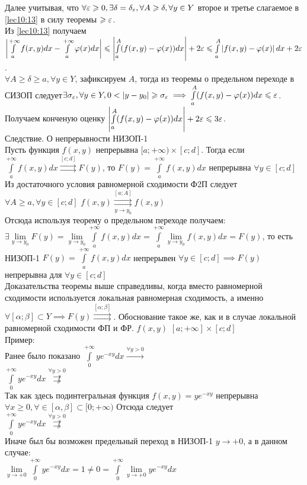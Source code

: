 \documentclass[a4paper,12pt,openany]{report}
\begin{document}
Далее учитывая, что $\forall \varepsilon \geqslant 0, \exists \delta = \delta_\varepsilon, \forall 
A \geqslant \delta, \forall y \in Y  $ второе и третье слагаемое в \eqref{lec10:13}
в силу теоремы $ \geqslant \varepsilon$.
\\
Из \eqref{lec10:13} получаем $ \left| \int\limits_{a}^{+\infty}f(x,y)dx - 
\int\limits_{a}^{+\infty}\varphi(x)dx\right| \leqslant \left| 
\int\limits_{a}^{A}(f(x,y) - \varphi(x))dx \right| + 2\varepsilon \leqslant 
\int\limits_{a}^{A}\left| f(x,y) - \varphi(x)\right|dx + 2\varepsilon  $.
\\
$ \forall A \ge \delta \ge a, \forall y \in Y$, зафиксируем $A$, тогда из 
теоремы о предельном переходе в СИЗОП следует$ \exists \sigma_\varepsilon, \forall y 
\in Y, 0 < \left|y - y_0 \right| \geqslant \sigma_\varepsilon \implies 
\int\limits_{a}^{A}(f(x,y) - \varphi(x))dx \leqslant \varepsilon   $.
\\
Получаем конченую оценку $\left| \int\limits_{a}^{A}(f(x,y) - \varphi(x))dx 
\right| + 2\varepsilon \leqslant 3\varepsilon$.
\\
Следствие. О непрерывности НИЗОП-1
\\
Пусть функция $f(x,y)$ непрерывна $[a;+\infty) \times [ c; d]$. Тогда если 
$\int\limits_a^{+\infty}f(x,y)dx \overset{[c;d]}\rightrightarrows F(y)$, то
$ F(y) = \int\limits_a^{+\infty}f(x,y)dx$ непрерывна $\forall y \in [c;d]$
Из достаточного условия равномерной сходимости Ф2П следует $\forall A \ge a, 
\forall y \in [c;d] $ $f(x,y) \overset{[a;A]}{\underset{y \to 
y_0}{\rightrightarrows}} f(x,y) $
\\
Отсюда используя теорему о предельном переходе получаем:$\exists \underset{y 
\to y_0}{\lim} F(y) = \underset{y \to y_0}\lim \int\limits_a^{+\infty}f(x,y)dx 
= \int\limits_a^{+\infty}\underset{y \to y_0}\lim f(x,y)dx = F(y) $, то есть 
НИЗОП-1 $F(y) = \int\limits_a^{+\infty}f(x,y)dx $ непрерывен $ \forall y \in 
[c;d] \implies F(y) $непрерывна для $ \forall y \in [c;d]$
\\
Доказательства теоремы выше справедливы, когда вместо равномерной сходимости 
используется локальная равномерная сходимость, а именно$\forall [\alpha;\beta] 
\subset Y \implies F(y) \overset{[\alpha;\beta]}{\rightrightarrows}$. 
Обоснование такое же, как и в случае локальной равномерной сходимости ФП и ФР.
$f(x,y)$ $[a;+\infty]\times[c;d]$
\\
Пример:
\\
Ранее было показано
$\int\limits_0^{+\infty}ye^{-xy}dx \xrightarrow{\forall y > 0}$
\\
$\int\limits_0^{+\infty}ye^{-xy}dx \overset{\forall y > 
0}{\not\rightrightarrows}$
\\
Так как здесь подинтегральная функция $f(x,y) = ye^{-xy}$ непрерывна $\forall 
x \ge 0, \forall \in [\alpha,\beta] \subset [0;+\infty)$ 
Отсюда следует
\\
$\int\limits_0^{+\infty}ye^{-xy}dx \overset{\forall y > 
0}{\not\rightrightarrows}$
\\
Иначе был бы возможен предельный переход в НИЗОП-1 $y \to +0 $, а в данном 
случае:
\\
$\underset{y \to +0}\lim\int\limits_0^{+\infty}ye^{-xy}dx = 1 \ne 0 = 
\int\limits_0^{+\infty}\underset{y \to +0}\lim ye^{-xy}dx$
\\
\\
\end{document}
